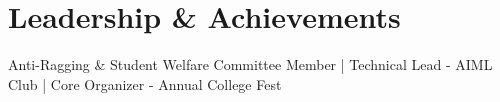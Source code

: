 \section{Leadership \& Achievements}
    \begin{itemize}[leftmargin=0.15in,  label={}]
	\small{\item{
		Anti-Ragging \& Student Welfare Committee Member | Technical Lead - AIML Club | Core Organizer - Annual College Fest
	}}
    \end{itemize}
